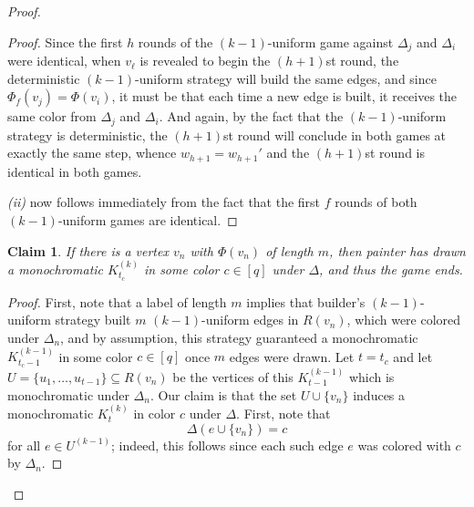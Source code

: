 \documentclass[10pt,a4paper]{amsart}
\newtheorem{claim}{Claim}
\def\l{\ell}
\begin{document}
\begin{proof}
\begin{proof}
    Since the first $h$ rounds of the $(k-1)$-uniform game against $\Delta_j$ and $\Delta_i$ were identical, when $v_\l$ is revealed to begin the $(h+1)$st round, the deterministic $(k-1)$-uniform strategy will build the same edges, and since $\Phi_f(v_j) = \Phi(v_i)$, it must be that each time a new edge is built, it receives the same color from $\Delta_j$ and $\Delta_i$.
    And again, by the fact that the $(k-1)$-uniform strategy is deterministic, the $(h+1)$st round will conclude in both games at exactly the same step, whence $w_{h+1}=w_{h+1}'$ and the $(h+1)$st round is identical in both games.

    {\it (ii)} now follows immediately from the fact that the first $f$ rounds of both $(k-1)$-uniform games are identical.
\end{proof}

\begin{claim}
\label{clm: endgame}
    If there is a vertex $v_n$ with $\Phi(v_n)$ of length $m$, then painter has drawn a monochromatic $K_{t_c}^{(k)}$ in some color $c \in [q]$ under $\Delta$, and thus the game ends.
\end{claim}

\begin{proof}
    First, note that a label of length $m$ implies that builder's $(k-1)$-uniform strategy built $m$ $(k-1)$-uniform edges in $R(v_n)$, which were colored under $\Delta_n$, and by assumption, this strategy guaranteed a monochromatic $K_{t_c-1}^{(k-1)}$ in some color $c \in [q]$ once $m$ edges were drawn.
    Let $t=t_c$ and let $U = \{u_1, \dots, u_{t-1}\} \subseteq R(v_n)$ be the vertices of this $K_{t-1}^{(k-1)}$ which is monochromatic under $\Delta_n$.
    Our claim is that the set $U \cup \{v_n\}$ induces a monochromatic $K_t^{(k)}$ in color $c$ under $\Delta$.
    First, note that 
    \begin{equation*}
        \Delta(e \cup \{v_n\}) = c
    \end{equation*}
    for all $e \in U^{(k-1)}$;
    indeed, this follows since each such edge $e$ was colored with $c$ by $\Delta_n$.


\end{proof}
\end{proof}
\end{document}
